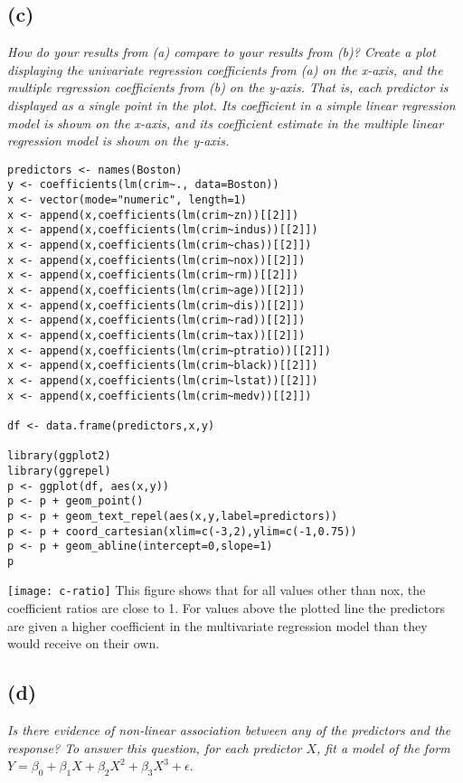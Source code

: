 \documentclass[a4paper,man,natbib]{apa6}
\begin{document}
\subsection{(c)}
\emph{
	How do your results from (a) compare to your results from (b)?
	Create a plot displaying the univariate regression coefficients
	from (a) on the x-axis, and the multiple regression coefficients
	from (b) on the y-axis. That is, each predictor is displayed as a
	single point in the plot. Its coefficient in a simple linear regression model is shown on the x-axis, and its coefficient estimate
	in the multiple linear regression model is shown on the y-axis.
} \\
\begin{verbatim}
predictors <- names(Boston)
y <- coefficients(lm(crim~., data=Boston))
x <- vector(mode="numeric", length=1)
x <- append(x,coefficients(lm(crim~zn))[[2]])
x <- append(x,coefficients(lm(crim~indus))[[2]])
x <- append(x,coefficients(lm(crim~chas))[[2]])
x <- append(x,coefficients(lm(crim~nox))[[2]])
x <- append(x,coefficients(lm(crim~rm))[[2]])
x <- append(x,coefficients(lm(crim~age))[[2]])
x <- append(x,coefficients(lm(crim~dis))[[2]])
x <- append(x,coefficients(lm(crim~rad))[[2]])
x <- append(x,coefficients(lm(crim~tax))[[2]])
x <- append(x,coefficients(lm(crim~ptratio))[[2]])
x <- append(x,coefficients(lm(crim~black))[[2]])
x <- append(x,coefficients(lm(crim~lstat))[[2]])
x <- append(x,coefficients(lm(crim~medv))[[2]])

df <- data.frame(predictors,x,y)

library(ggplot2)
library(ggrepel)
p <- ggplot(df, aes(x,y)) 
p <- p + geom_point() 
p <- p + geom_text_repel(aes(x,y,label=predictors)) 
p <- p + coord_cartesian(xlim=c(-3,2),ylim=c(-1,0.75))
p <- p + geom_abline(intercept=0,slope=1)
p
\end{verbatim}
\texttt{[image: c-ratio]}
This figure shows that for all values other than nox, the coefficient ratios are close to 1. For values above the plotted line the predictors are given a higher coefficient in the multivariate regression model than they would receive on their own.

\subsection{(d)}
\emph{
	Is there evidence of non-linear association between any of the
	predictors and the response? To answer this question, for each
	predictor $X$, fit a model of the form }\\
	$Y = \beta_0 + \beta_1X + \beta_2X^2 + \beta_3X^3 + \epsilon$.
	
\end{document}
